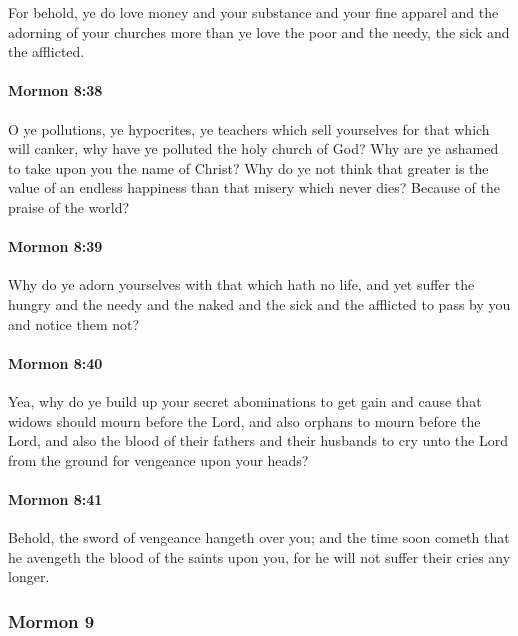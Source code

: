 			For behold, ye do love money and your substance and your fine apparel
			and the adorning of your churches
			more than ye love the poor and the needy, the sick and the afflicted.

		\paragraph{Mormon 8:38} %
			\label{MORMON-8-38}

			O ye pollutions, ye hypocrites,
			ye teachers which sell yourselves for that which will canker,
			why have ye polluted the holy church of God?
			Why are ye ashamed to take upon you the name of Christ?
			Why do ye not think that greater is the value of an endless happiness
			than that misery which never dies?
			Because of the praise of the world?

		\paragraph{Mormon 8:39} %
			\label{MORMON-8-39}

			Why do ye adorn yourselves with that which hath no life,
			and yet suffer the hungry and the needy and the naked
			and the sick and the afflicted to pass by you and notice them not?

		\paragraph{Mormon 8:40} %
			\label{MORMON-8-40}

			Yea, why do ye build up your secret abominations to get gain
			and cause that widows should mourn before the Lord,
			and also orphans to mourn before the Lord,
			and also the blood of their fathers and their husbands
			to cry unto the Lord from the ground for vengeance upon your heads?

		\paragraph{Mormon 8:41} %
			\label{MORMON-8-41}

			Behold, the sword of vengeance hangeth over you;
			and the time soon cometh that he avengeth the blood of the saints upon you,
			for he will not suffer their cries any longer.

	\subsubsection{Mormon 9} %
		\label{MORMON-9}
		
